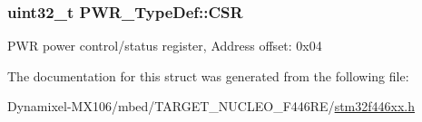 \subsubsection[{\texorpdfstring{C\+SR}{CSR}}]{ uint32\+\_\+t P\+W\+R\+\_\+\+Type\+Def\+::\+C\+SR}\hypertarget{struct_p_w_r___type_def_ae17097e69c88b6c00033d6fb84a8182b}{}\label{struct_p_w_r___type_def_ae17097e69c88b6c00033d6fb84a8182b}
P\+WR power control/status register, Address offset\+: 0x04 

The documentation for this struct was generated from the following file\+:\begin{DoxyCompactItemize}
\item 
Dynamixel-\/\+M\+X106/mbed/\+T\+A\+R\+G\+E\+T\+\_\+\+N\+U\+C\+L\+E\+O\+\_\+\+F446\+R\+E/\hyperlink{stm32f446xx_8h}{stm32f446xx.\+h}\end{DoxyCompactItemize}

